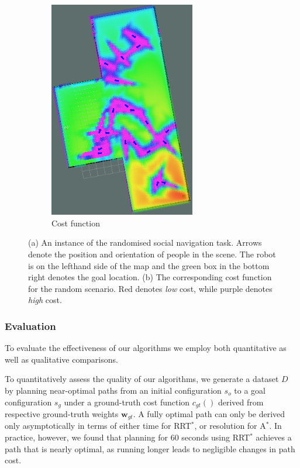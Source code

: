 \documentclass[a4paper,11pt]{report}
\begin{document}
\begin{figure}[tbh]
\begin{subfigure}[b]{0.435\columnwidth}
    \includegraphics[width=0.7\textwidth]{figures/cost_f.png}
    \caption{Cost function}
    \label{fig:cost_f}
  \end{subfigure} 

  \caption{(a) An instance of the randomised social navigation task. Arrows denote the position and orientation of people in the scene. The robot is on the lefthand side of the map and the green box in the bottom right denotes the goal location. (b) The corresponding cost function for the random scenario. Red denotes \emph{low} cost, while purple denotes \emph{high} cost.}

  \label{fig:setting}
  \end{figure}


	\subsubsection{Evaluation}

	To evaluate the effectiveness of our algorithms we employ both quantitative as well as qualitative comparisons.

	To quantitatively assess the quality of our algorithms, we generate a dataset $D$ by planning near-optimal paths from an initial configuration $s_o$ to a goal configuration $s_g$ under a ground-truth cost function $c_{gt}()$ derived from respective ground-truth weights $\mathbf{w}_{gt}$. A fully optimal path can only be derived only asymptotically in terms of either time  for RRT$^*$, or resolution for A$^*$. In practice, however, we found that planning for 60 seconds using  RRT$^*$  achieves a path that is nearly optimal, as running longer leads to negligible changes in path cost. 
\end{document}
